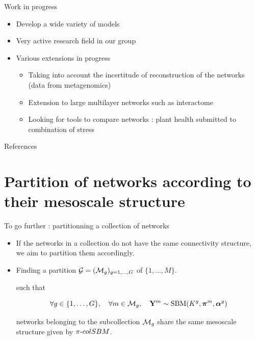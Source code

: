 \documentclass[compress,10pt]{beamer}
\begin{document}
 
\begin{frame}{Work in progress}
\begin{itemize}
\item Develop a wide variety of models
\item Very active research field in our group
\item Various extensions in progress
\begin{itemize}
\item Taking into account the incertitude of reconstruction of the networks (data from metagenomics)
\item Extension to large multilayer networks such as interactome
\item Looking for tools to compare networks : plant health submitted to combination of stress
\end{itemize}
\end{itemize}

\end{frame}






\begin{frame}[allowframebreaks]{References}


  
  

\end{frame}

\section*{Partition of networks according to their  mesoscale structure}

\begin{frame}{To go further : partitionning a collection of networks}
  
\begin{itemize}
 \item If the networks in a collection do not have the same connectivity structure, we aim to partition them accordingly.
 \item Finding   a partition $\mathcal{G} = (\mathcal{M}_g)_{g  = 1, \dots,G}$ of $\{1, \dots,M\}$. %
 
 such that
 
\begin{equation*}
 \forall g \in \{1, \dots, G\}, \quad \forall m \in \mathcal{M}_g, \quad  \mathbf{Y}^m \sim \mbox{SBM}(K^g, \boldsymbol{\pi}^{m}, \boldsymbol{\alpha}^g)
\end{equation*}

networks belonging to the subcollection $\mathcal{M}_g$ share the same mesoscale structure given by  $\pi\text{-}colSBM$. %
 \end{itemize}

 \end{frame}
 
\end{document}

